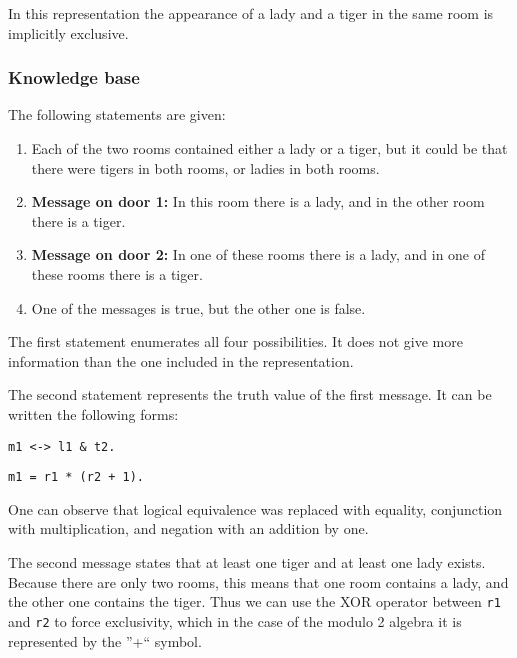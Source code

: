 In this representation the appearance of a lady and a tiger in the same room is implicitly exclusive.



\subsubsection{Knowledge base}

The following statements are given:

\begin{enumerate}

\item Each of the two rooms contained either a lady or a tiger, but it could be that there were tigers in both rooms, or ladies in both rooms.

\item \textbf{Message on door 1:} In this room there is a lady, and in the other room there is a tiger.

\item \textbf{Message on door 2:} In one of these rooms there is a lady, and in one of these rooms there is a tiger.

\item One of the messages is true, but the other one is false.

\end{enumerate}

The first statement enumerates all four possibilities. It does not give more information than the one included in the representation.

The second statement represents the truth value of the first message. It can be written the following forms:

\begin{multicols}{2}

\begin{lstlisting}[numbers=none,title=Propositional logic]
m1 <-> l1 & t2.
\end{lstlisting}

\begin{lstlisting}[numbers=none,title=Modular arithmetics]
m1 = r1 * (r2 + 1).
\end{lstlisting}

\end{multicols}

One can observe that logical equivalence was replaced with equality, conjunction with multiplication, and negation with an addition by one.

The second message states that at least one tiger and at least one lady exists. Because there are only two rooms, this means that one room contains a lady, and the other one contains the tiger. Thus we can use the XOR operator between \verb|r1| and \verb|r2| to force exclusivity, which in the case of the modulo 2 algebra it is represented by the ''+`` symbol.

